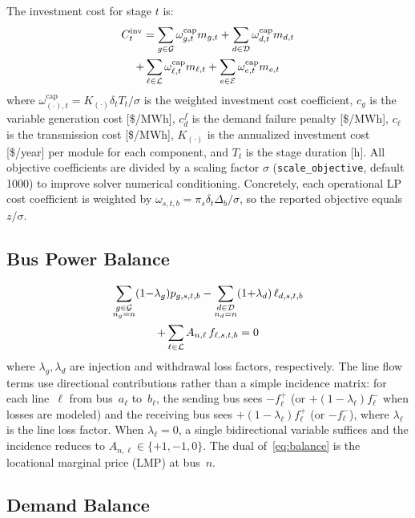 The investment cost for stage $t$ is:
\begin{multline}
\label{eq:invcost}
C^\text{inv}_t = \sum_{g \in \mathcal{G}} \omega^\text{cap}_{g,t} m_{g,t}
  + \sum_{d \in \mathcal{D}} \omega^\text{cap}_{d,t} m_{d,t} \\
  + \sum_{\ell \in \mathcal{L}} \omega^\text{cap}_{\ell,t} m_{\ell,t}
  + \sum_{e \in \mathcal{E}} \omega^\text{cap}_{e,t} m_{e,t}
\end{multline}
where $\omega^\text{cap}_{(\cdot),t} = K_{(\cdot)} \delta_t T_t /
\sigma$ is the weighted investment cost coefficient,
$c_g$ is the variable generation cost [\$/MWh], $c^f_d$ is the
demand failure penalty [\$/MWh], $c_\ell$ is the transmission cost
[\$/MWh], $K_{(\cdot)}$ is the annualized investment cost
[\$/year] per module for each component, and $T_t$ is the stage
duration [h].  All objective coefficients are divided by a
scaling factor $\sigma$ (\texttt{scale\_objective}, default 1000) to
improve solver numerical conditioning.  Concretely, each operational LP
cost coefficient is weighted by $\omega_{s,t,b} = \pi_s \delta_t
\Delta_b / \sigma$, so the reported objective equals $z/\sigma$.

\subsection{Bus Power Balance}
\label{sec:balance}
\begin{multline}
\label{eq:balance}
\sum_{\substack{g \in \mathcal{G} \\ n_g = n}} (1{-}\lambda_g) p_{g,s,t,b}
- \sum_{\substack{d \in \mathcal{D} \\ n_d = n}}
  (1{+}\lambda_d)\,\ell_{d,s,t,b} \\
+ \sum_{\ell \in \mathcal{L}} A_{n,\ell} \, f_{\ell,s,t,b} = 0
\end{multline}
where $\lambda_g, \lambda_d$ are injection and withdrawal loss factors,
respectively.  The line flow terms use directional contributions rather
than a simple incidence matrix: for each line~$\ell$ from bus~$a_\ell$
to~$b_\ell$, the sending bus sees $-f^+_\ell$ (or $+(1-\lambda_\ell)
f^-_\ell$ when losses are modeled) and the receiving bus sees
$+(1-\lambda_\ell)f^+_\ell$ (or $-f^-_\ell$), where $\lambda_\ell$
is the line loss factor.  When $\lambda_\ell=0$, a single bidirectional
variable suffices and the incidence reduces to $A_{n,\ell} \in
\{+1,-1,0\}$.  The dual of~\eqref{eq:balance} is the locational marginal
price (LMP) at bus~$n$.

\subsection{Demand Balance}

